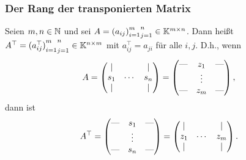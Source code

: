 \subsubsection{Der Rang der transponierten Matrix}

Seien $ m,n \in \mathbb N $ und sei $ A = {{(a_{ij})}_{i=1}^m}_{j=1}^n \in \mathbb K^{m \times n} $. Dann heißt $ A^\top = {{(a_{ij}^\top)}_{i=1}^m}_{j=1}^n \in \mathbb K^{n \times m} $ mit $ a_{ij}^\top = a_{ji} $ für alle $ i,j $. D.h., wenn
\begin{equation*}
	A =
	\begin{pmatrix}
	| & & | \\
	s_1 & \cdots & s_n \\
	| & & |
	\end{pmatrix}
	=
	\begin{pmatrix}
	\text{\textemdash} & z_1 & \text{\textemdash} \\
	& \vdots & \\
	\text{\textemdash} & z_m & \text{\textemdash}
	\end{pmatrix},
\end{equation*}
dann ist
\begin{equation*}
	A^\top =
	\begin{pmatrix}
	\text{\textemdash} & s_1 & \text{\textemdash} \\
	& \vdots & \\
	\text{\textemdash} & s_n & \text{\textemdash}
	\end{pmatrix}
	=
	\begin{pmatrix}
	| & & | \\
	z_1 & \cdots & z_m \\
	| & & |
	\end{pmatrix}.
\end{equation*}

